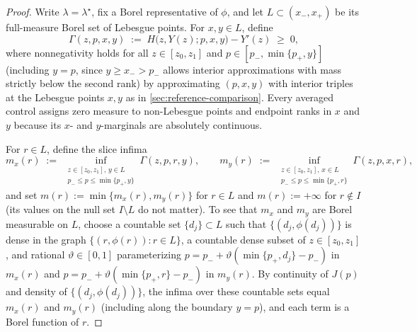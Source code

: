 \documentclass[11pt]{article}
\numberwithin{equation}{section}
\theoremstyle{plain}
\theoremstyle{definition}
\newcommand{\1}{\mathbf{1}}
\begin{document}
\begin{proof}
Write $\lambda = \lambda^\star$, fix a Borel representative of $\phi$, and let $L \subset (x_-, x_+)$ be its full-measure Borel set of Lebesgue points. For $x, y \in L$, define
\[
  \Gamma(z, p, x, y) \;:=\; H\bigl(z, Y(z); p, x, y\bigr) - Y'(z) \;\ge\; 0,
\]
where nonnegativity holds for all $z \in [z_0, z_1]$ and $p \in [p_-, \min\{p_+, y\}]$ (including $y = p$, since $y \ge x_- > p_-$ allows interior approximations with mass strictly below the second rank) by approximating $(p, x, y)$ with interior triples at the Lebesgue points $x, y$ as in \cref{sec:reference-comparison}. Every averaged control assigns zero measure to non-Lebesgue points and endpoint ranks in $x$ and $y$ because its $x$- and $y$-marginals are absolutely continuous.

For $r \in L$, define the slice infima
\[
  m_x(r) \;:=\; \inf_{\substack{z \in [z_0, z_1],\, y \in L \\ p_- \le p \le \min\{p_+, y\}}} \Gamma(z, p, r, y),
  \qquad
  m_y(r) \;:=\; \inf_{\substack{z \in [z_0, z_1],\, x \in L \\ p_- \le p \le \min\{p_+, r\}}} \Gamma(z, p, x, r),
\]
and set $m(r) := \min\{m_x(r), m_y(r)\}$ for $r \in L$ and $m(r) := +\infty$ for $r \notin I$ (its values on the null set $I \setminus L$ do not matter). To see that $m_x$ and $m_y$ are Borel measurable on $L$, choose a countable set $\{d_j\} \subset L$ such that $\{(d_j, \phi(d_j))\}$ is dense in the graph $\{(r, \phi(r)) : r \in L\}$, a countable dense subset of $z \in [z_0, z_1]$, and rational $\vartheta \in [0, 1]$ parameterizing $p = p_- + \vartheta(\min\{p_+, d_j\} - p_-)$ in $m_x(r)$ and $p = p_- + \vartheta(\min\{p_+, r\} - p_-)$ in $m_y(r)$. By continuity of $J(p)$ and density of $\{(d_j, \phi(d_j))\}$, the infima over these countable sets equal $m_x(r)$ and $m_y(r)$ (including along the boundary $y = p$), and each term is a Borel function of $r$.


\end{proof}
\end{document}
